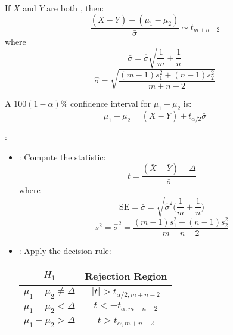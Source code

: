 \begin{multicols}{3}
 \par If $X$ and $Y$ are both , then:
    \[
      \frac{(\bar{X} - \bar{Y}) - (\mu_1 - \mu_2)}{\bar{\sigma}} \sim t_{m + n - 2}
    \]
    where
    \[
      \bar{\sigma} = \hat{\sigma} \sqrt{\frac{1}{m} + \frac{1}{n}}
    \]
    \[
      \hat{\sigma} = \sqrt{\frac{(m - 1)s_1^2 + (n - 1)s_2^2}{m + n - 2}}
    \]
  \par A $100(1 - \alpha)\%$ confidence interval for $\mu_1 - \mu_2$ is:
    \[
      \mu_1 - \mu_2 = (\bar{X} - \bar{Y}) \pm t_{\alpha/2} \bar{\sigma}
    \]
    \par {}:
    \begin{itemize}
      \item {}: Compute the statistic:
        \[
          t = \frac{(\bar{X} - \bar{Y}) - \Delta}{\bar{\sigma}}
        \]
        where
        \[
          \text{SE} = \bar{\sigma} = \sqrt{\hat{\sigma}^2
            \bigg(
              \frac{1}{m} + \frac{1}{n}
            \bigg)}
        \]
        \[
          s^2 = \hat{\sigma}^2 = \frac{(m - 1)s_1^2 + (n - 1)s_2^2}{m + n - 2}
        \]
      \item {}: Apply the decision rule:
      \begin{center}
      \begin{tabular}{|c|c|}
        \hline
        \textbf{$H_1$}              & \textbf{Rejection Region} \\ \hline
        $\mu_1 - \mu_2 \neq \Delta$ & $|t| > t_{\alpha/2, m + n - 2}$      \\ \hline
        $\mu_1 - \mu_2 < \Delta$    & $t < -t_{\alpha, m + n - 2}$         \\ \hline
        $\mu_1 - \mu_2 > \Delta$    & $t > t_{\alpha, m + n - 2}$          \\ \hline
        \end{tabular}
      \end{center}
    \end{itemize}


\end{multicols}
